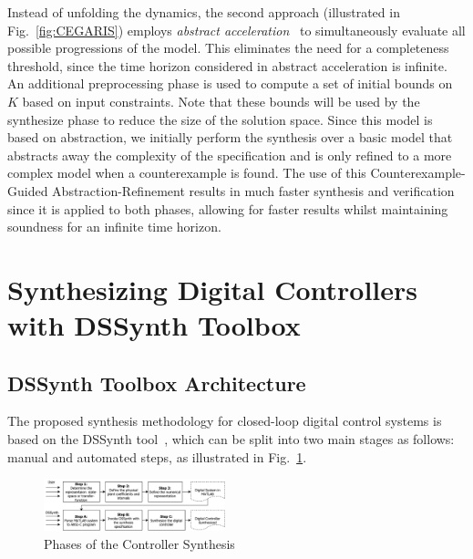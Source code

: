 \documentclass[10pt,conference]{IEEEtran}
\newcommand\tool{{DSSynth Toolbox}\xspace}
\begin{document}
Instead of unfolding the dynamics, the second approach (illustrated in
Fig.~\ref{fig:CEGARIS}) employs {\em abstract
acceleration}~\cite{cattaruzza2015unbounded} to simultaneously evaluate all
possible progressions of the model.  This eliminates the need for a
completeness threshold, since the time horizon considered in abstract
acceleration is infinite.  An additional preprocessing phase is used to
compute a set of initial bounds on $K$ based on input constraints.  Note
that these bounds will be used by the {\sc synthesize} phase to reduce the
size of the solution space.
%
Since this model is based on abstraction, we initially perform the synthesis
over a basic model that abstracts away the complexity of the specification
and is only refined to a more complex model when a counterexample is found.
%
%
The use of this Counterexample-Guided Abstraction-Refinement results in much
faster synthesis and verification since it is applied to both phases,
allowing for faster results whilst maintaining soundness for an infinite
time horizon.
 

\section{Synthesizing Digital Controllers with \tool}

\subsection{\tool Architecture}

The proposed synthesis methodology for closed-loop digital control
systems is based on the DSSynth tool~\cite{abate2017, abatecav2017}, 
which can be split into two main stages as follows: manual and 
automated steps, as illustrated in Fig.~\ref{fig:synthesis-flow}. 

\begin{figure}[ht!]
\centering
\includegraphics[width=0.47\textwidth]{synthesis-flow.pdf}
\caption{Phases of the Controller Synthesis}
\label{fig:synthesis-flow}
\end{figure}
\end{document}
